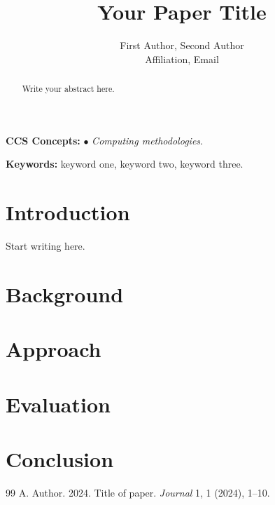 \documentclass[10pt,twocolumn]{article}
\title{\textbf{Your Paper Title}}
\author{First Author, Second Author\\ \small Affiliation, Email}
\date{}
\begin{document}
\maketitle

\begin{abstract}
Write your abstract here.
\end{abstract}

\textbf{CCS Concepts:} $\bullet$ \textit{Computing methodologies}.

\textbf{Keywords:} keyword one, keyword two, keyword three.

\section{Introduction}
Start writing here.

\section{Background}

\section{Approach}

\section{Evaluation}

\section{Conclusion}

\begin{thebibliography}{99}
 A. Author. 2024. Title of paper. \textit{Journal} 1, 1 (2024), 1--10.
\end{thebibliography}
\end{document}
